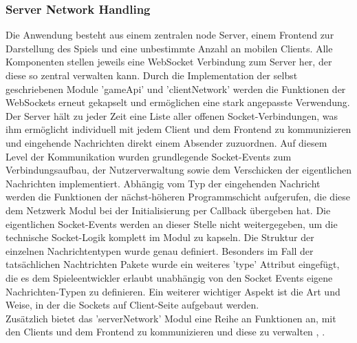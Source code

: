 \documentclass[a4paper]{spie}  %
\begin{document}
\subsubsection{Server Network Handling}
Die Anwendung besteht aus einem zentralen node Server, einem Frontend zur Darstellung des Spiels und eine unbestimmte Anzahl an mobilen Clients. Alle Komponenten stellen jeweils eine WebSocket Verbindung zum Server her, der diese so zentral verwalten kann. Durch die Implementation der selbst geschriebenen Module 'gameApi' und 'clientNetwork' werden die Funktionen der WebSockets erneut gekapselt und ermöglichen eine stark angepasste Verwendung.\\
Der Server hält zu jeder Zeit eine Liste aller offenen Socket-Verbindungen, was ihm ermöglicht individuell mit jedem Client und dem Frontend zu kommunizieren und eingehende Nachrichten direkt einem Absender zuzuordnen. Auf diesem Level der Kommunikation wurden grundlegende Socket-Events zum Verbindungsaufbau, der Nutzerverwaltung sowie dem Verschicken der eigentlichen Nachrichten implementiert. Abhängig vom Typ der eingehenden Nachricht werden die Funktionen der nächst-höheren Programmschicht aufgerufen, die diese dem Netzwerk Modul bei der Initialisierung per Callback übergeben hat. Die eigentlichen Socket-Events werden an dieser Stelle nicht weitergegeben, um die technische Socket-Logik komplett im Modul zu kapseln. Die Struktur der einzelnen Nachrichtentypen wurde genau definiert. Besonders im Fall der tatsächlichen Nachtrichten Pakete wurde ein weiteres 'type' Attribut eingefügt, die es dem Spieleentwickler erlaubt unabhängig von den Socket Events eigene Nachrichten-Typen zu definieren. Ein weiterer wichtiger Aspekt ist die Art und Weise, in der die Sockets auf Client-Seite aufgebaut werden.\\
Zusätzlich bietet das 'serverNetwork' Modul eine Reihe an Funktionen an, mit den Clients und dem Frontend zu kommunizieren und diese zu verwalten \cite{js-object2pages},\cite{js-persistencewebsockets} .
\end{document}
